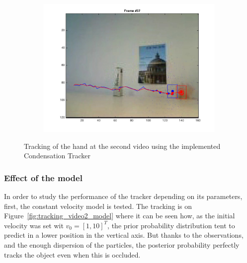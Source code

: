 \documentclass{ethz_report}
\begin{document}
\begin{figure}[H]
\begin{subfigure}[b]{.25\textwidth}
    \end{subfigure}%
    \begin{subfigure}[b]{.25\textwidth}
        \centering
        \includegraphics[width=1\linewidth]{images/video2__36}
    \end{subfigure}
    \caption{Tracking of the hand at the second video using the implemented Condensation Tracker}
    \label{fig:tracking_video2}
\end{figure}

\subsubsection*{Effect of the model}

In order to study the performance of the tracker depending on its parameters, first, the constant velocity model is tested.
The tracking is on Figure~\ref{fig:tracking_video2_model} where it can be seen how, as the initial velocity was set wit $v_0 = [ 1, 10 ]^T$, the prior probability distribution tent to predict in a lower position in the vertical axis. 
But thanks to the observations, and the enough dispersion of the particles, the posterior probability perfectly tracks the object even when this is occluded.
\end{document}
